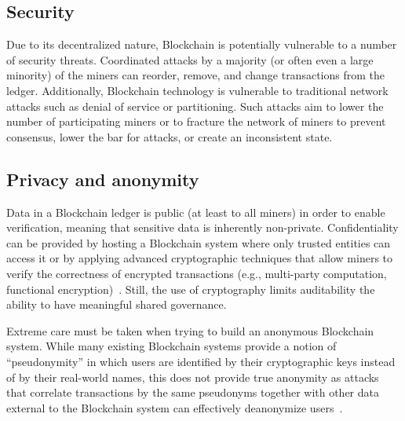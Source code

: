 \subsection{Security}
Due to its decentralized nature, Blockchain is potentially vulnerable to a number of security threats.
Coordinated attacks by a majority (or often even a large minority) of the miners can reorder, remove, and change transactions from the ledger. 
Additionally, Blockchain technology is vulnerable to traditional network attacks such as denial of service or partitioning.
Such attacks aim to lower the number of participating miners or to fracture the network of miners to prevent consensus, lower the bar for attacks, or create an inconsistent state.

\subsection{Privacy and anonymity}
Data in a Blockchain ledger is public (at least to all miners) in order to enable verification, meaning that sensitive data is inherently non-private.
Confidentiality can be provided by hosting a Blockchain system where only trusted entities can access it or by applying advanced cryptographic techniques that allow miners to verify the correctness of encrypted transactions (e.g., multi-party computation, functional encryption)~\cite{SP:KMSWP16}.
Still, the use of cryptography limits auditability the ability to have meaningful shared governance.

Extreme care must be taken when trying to build an anonymous Blockchain system.
While many existing Blockchain systems provide a notion of ``pseudonymity'' in which users are identified by their cryptographic keys instead of by their real-world names, this does not provide true anonymity as attacks that correlate transactions by the same pseudonyms together with other data external to the Blockchain system can effectively deanonymize users~\cite{DBLP:journals/corr/abs-1708-04748}.

